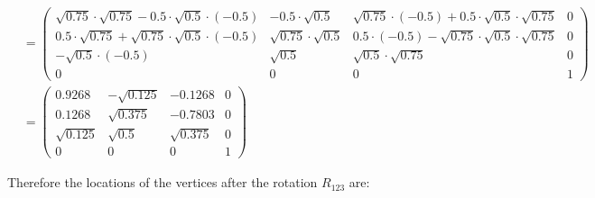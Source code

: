 \begin{align*}
 &=
 \begin{pmatrix}
 \sqrt{0.75}\cdot \sqrt{0.75}-0.5\cdot \sqrt{0.5} \cdot (-0.5) & -0.5\cdot \sqrt{0.5} & \sqrt{0.75} \cdot (-0.5) + 0.5\cdot \sqrt{0.5} \cdot \sqrt{0.75} & 0 \\
 0.5 \cdot \sqrt{0.75}+\sqrt{0.75}\cdot \sqrt{0.5}\cdot (-0.5) & \sqrt{0.75}\cdot \sqrt{0.5} &  0.5 \cdot (-0.5) -\sqrt{0.75}\cdot \sqrt{0.5} \cdot \sqrt{0.75} & 0 \\
 -\sqrt{0.5} \cdot (-0.5) & \sqrt{0.5} & \sqrt{0.5} \cdot \sqrt{0.75}  & 0 \\
 0 & 0 & 0 & 1  
 \end{pmatrix}\\
 &=
 \begin{pmatrix}
0.9268 & -\sqrt{0.125} & -0.1268 & 0 \\
0.1268 & \sqrt{0.375} &  -0.7803 & 0 \\
\sqrt{0.125} & \sqrt{0.5} & \sqrt{0.375}  & 0 \\
 0 & 0 & 0 & 1  
 \end{pmatrix}
\end{align*}

Therefore the locations of the vertices after the rotation $R_{123}$ are:


